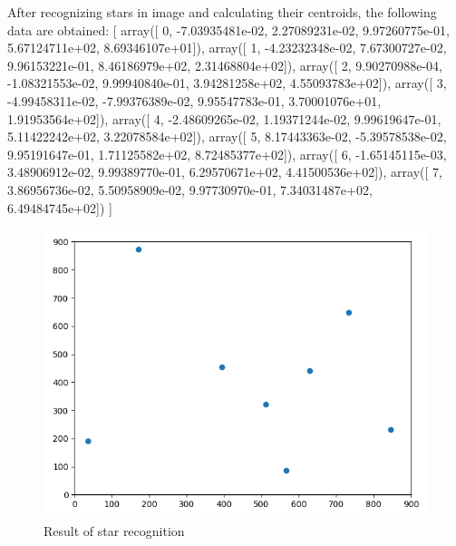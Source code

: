 \documentclass[12pt,a4paper,oneside]{article}
\begin{document}
After recognizing stars in image and calculating their centroids, the following data are obtained:
[
array([ 0, -7.03935481e-02,  2.27089231e-02,  9.97260775e-01, 5.67124711e+02,  8.69346107e+01]),
array([ 1, -4.23232348e-02,  7.67300727e-02,  9.96153221e-01, 8.46186979e+02,  2.31468804e+02]), 
array([ 2,  9.90270988e-04, -1.08321553e-02,  9.99940840e-01, 3.94281258e+02,  4.55093783e+02]), 
array([ 3, -4.99458311e-02, -7.99376389e-02,  9.95547783e-01, 3.70001076e+01,  1.91953564e+02]), 
array([ 4, -2.48609265e-02,  1.19371244e-02,  9.99619647e-01, 5.11422242e+02,  3.22078584e+02]), 
array([ 5,  8.17443363e-02, -5.39578538e-02,  9.95191647e-01, 1.71125582e+02,  8.72485377e+02]),
array([ 6, -1.65145115e-03,  3.48906912e-02,  9.99389770e-01, 6.29570671e+02,  4.41500536e+02]),
array([ 7, 3.86956736e-02, 5.50958909e-02, 9.97730970e-01, 7.34031487e+02, 6.49484745e+02])
]


\begin{figure}[!htbp]
\includegraphics[scale=0.6]{example_1.png}
\centering
\caption{Result of star recognition}
\label{fig:example_1}
\end{figure}
\end{document}

